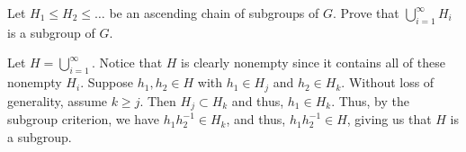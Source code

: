 \documentclass[12 pt, letterpaper]{hmcpset}
\begin{document}
\pagebreak

\begin{problem}
	Let $H_1 \le H_2 \le \dots$ be an ascending chain of subgroups of $G$. Prove that $\bigcup^\infty_{i = 1} H_i$ is a subgroup of $G$.
\end{problem}

\begin{solution}
	Let $H = \bigcup_{i = 1}^\infty$. Notice that $H$ is clearly nonempty since it contains all of these nonempty $H_i$. Suppose $h_1, h_2 \in H$ with $h_1 \in H_j$ and $h_2 \in H_k$. Without loss of generality, assume $k \ge j$. Then $H_j \subset H_k$ and thus, $h_1 \in H_k$. Thus, by the subgroup criterion, we have $h_1 h_2^{-1} \in H_k$, and thus, $h_1 h_2^{-1} \in H$, giving us that $H$ is a subgroup.
\end{solution}
\end{document}
